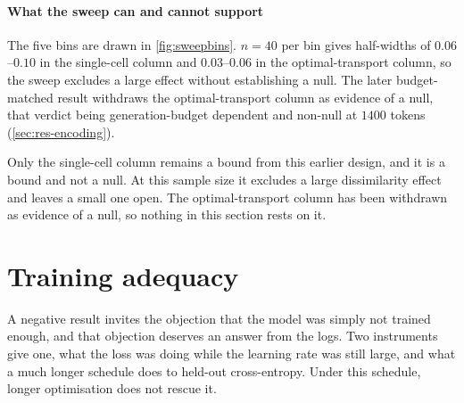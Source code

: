 \paragraph{What the sweep can and cannot support} The five bins are drawn in \cref{fig:sweepbins}. $n=40$
per bin gives half-widths of $0.06$--$0.10$ in the single-cell column and
$0.03$--$0.06$ in the optimal-transport column, so the sweep excludes a large
effect without establishing a
null. The later budget-matched result withdraws the
optimal-transport column as evidence of a null, that verdict being
generation-budget dependent and non-null at $1400$ tokens
(\cref{sec:res-encoding}).

\begin{scopelimit}
Only the single-cell column remains a bound from this earlier design, and it is
a bound and not a null. At this sample size it excludes a large dissimilarity
effect and leaves a small one open. The optimal-transport column has been
withdrawn as evidence of a null, so nothing in this section rests on it.
\end{scopelimit}

\framedecl{-}
\section{Training adequacy}
\label{sec:app-training}

\begin{question}
A negative result invites the objection that the model was simply not trained
enough, and that objection deserves an answer from the logs. Two instruments
give one, what the loss was doing while the learning rate was still large, and
what a much longer schedule does to held-out cross-entropy. Under this schedule,
longer optimisation does not rescue it.
\end{question}

